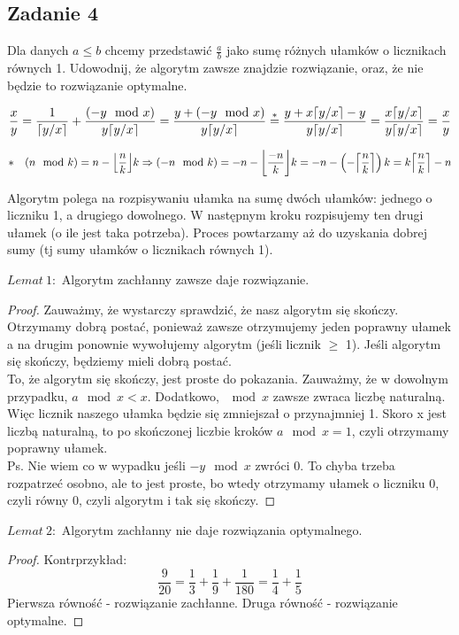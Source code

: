 \documentclass[a4paper]{article}
\DeclarePairedDelimiter\ceil{\lceil}{\rceil}
\DeclarePairedDelimiter\floor{\lfloor}{\rfloor}
\begin{document}
\subsection*{Zadanie 4}
Dla danych $a\leq b$ chcemy przedstawić $\frac{a}{b}$ jako sumę różnych ułamków o licznikach równych 1. Udowodnij, że algorytm zawsze znajdzie rozwiązanie, oraz, że nie będzie to rozwiązanie optymalne.

$$\frac{x}{y}=\frac{1}{\ceil{y/x}}+\frac{(-y \mod x)}{y\ceil{y/x}}=\frac{y+(-y \mod x)}{y\ceil{y/x}}\stackrel{*}{=}\frac{y+x\ceil{y/x}-y}{y\ceil{y/x}}=\frac{x\ceil{y/x}}{y\ceil{y/x}}=\frac{x}{y}$$

$$*\quad (n \mod k) = n-\floor*{\frac{n}{k}} k\Rightarrow (-n \mod k) = -n-\floor*{\frac{-n}{k}} k = -n-\left(-\ceil*{\frac{n}{k}}\right) k = k\ceil*{\frac{n}{k}} - n $$

Algorytm polega na rozpisywaniu ułamka na sumę dwóch ułamków: jednego o liczniku 1, a drugiego dowolnego. W następnym kroku rozpisujemy ten drugi ułamek (o ile jest taka potrzeba). Proces powtarzamy aż do uzyskania dobrej sumy (tj sumy ułamków o licznikach równych 1).

$Lemat\ 1:$ Algorytm zachłanny zawsze daje rozwiązanie.
\begin{proof}
Zauważmy, że wystarczy sprawdzić, że nasz algorytm się skończy. Otrzymamy dobrą postać, ponieważ zawsze otrzymujemy jeden poprawny ułamek a na drugim ponownie wywołujemy algorytm (jeśli licznik $\geq$ 1). Jeśli algorytm się skończy, będziemy mieli dobrą postać.\\
To, że algorytm się skończy, jest proste do pokazania. Zauważmy, że w dowolnym przypadku, $a \mod x < x$. Dodatkowo, $\mod x$ zawsze zwraca liczbę naturalną. Więc licznik naszego ułamka będzie się zmniejszał o przynajmniej 1. Skoro x jest liczbą naturalną, to po skończonej liczbie kroków $a \mod x = 1$, czyli otrzymamy poprawny ułamek. \\
Ps. Nie wiem co w wypadku jeśli $-y \mod x$ zwróci 0. To chyba trzeba rozpatrzeć osobno, ale to jest proste, bo wtedy otrzymamy ułamek o liczniku 0, czyli równy 0, czyli algorytm i tak się skończy.
\end{proof} 

$Lemat\ 2:$ Algorytm zachłanny nie daje rozwiązania optymalnego.
\begin{proof}
Kontrprzykład: $$\frac{9}{20} = \frac{1}{3}+\frac{1}{9}+\frac{1}{180} = \frac{1}{4}+\frac{1}{5}$$
Pierwsza równość - rozwiązanie zachłanne. Druga równość - rozwiązanie optymalne.
\end{proof}
\end{document}
